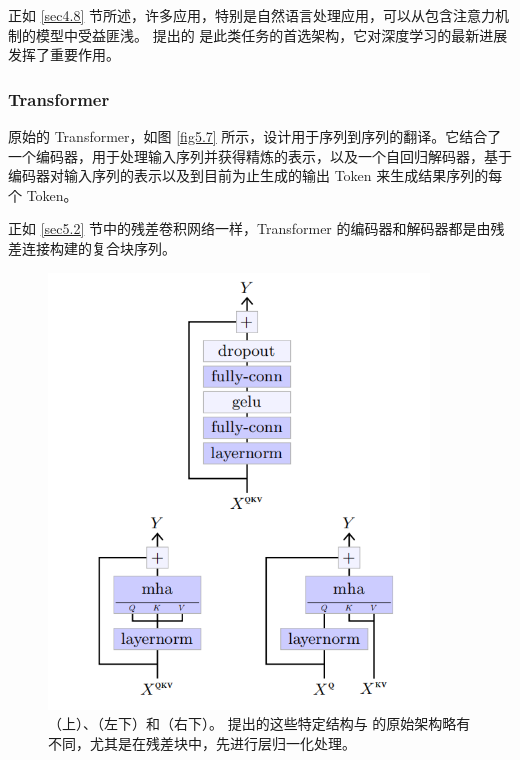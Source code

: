 正如 \ref{sec4.8} 节所述，许多应用，特别是自然语言处理应用，可以从包含注意力机制的模型中受益匪浅。\cite{arxiv-1706.03762} 提出的  是此类任务的首选架构，它对深度学习的最新进展发挥了重要作用。

\subsubsection*{Transformer}

原始的 Transformer，如图 \ref{fig5.7} 所示，设计用于序列到序列的翻译。它结合了一个编码器，用于处理输入序列并获得精炼的表示，以及一个自回归解码器，基于编码器对输入序列的表示以及到目前为止生成的输出 Token 来生成结果序列的每个 Token。

正如 \ref{sec5.2} 节中的残差卷积网络一样，Transformer 的编码器和解码器都是由残差连接构建的复合块序列。

\begin{figure}
    \centering
    \includegraphics[width=0.9\textwidth]{fig/fig5.6.png}
    \caption[Transformer 组件]{（上）、（左下）和（右下）。\cite{Radford2018} 提出的这些特定结构与 \cite{arxiv-1706.03762} 的原始架构略有不同，尤其是在残差块中，先进行层归一化处理。}
    \label{fig5.6}
\end{figure}

